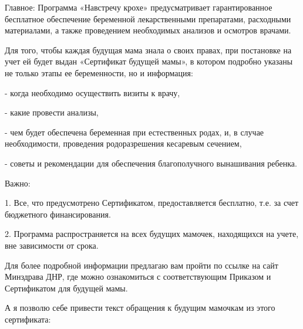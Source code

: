Главное: Программа «Навстречу крохе» предусматривает гарантированное бесплатное
обеспечение беременной лекарственными препаратами, расходными материалами, а
также проведением необходимых анализов и осмотров врачами.

Для того, чтобы каждая будущая мама знала о своих правах, при постановке на
учет ей будет выдан «Сертификат будущей мамы», в котором подробно указаны не
только этапы ее беременности, но и информация:

- когда необходимо осуществить визиты к врачу,

- какие провести анализы,

- чем будет обеспечена беременная при естественных родах, и, в случае
необходимости, проведения родоразрешения кесаревым сечением,

- советы и рекомендации для обеспечения благополучного вынашивания ребенка.

Важно:

1. Все, что предусмотрено Сертификатом, предоставляется бесплатно, т.е. за счет
бюджетного финансирования.

2. Программа распространяется на всех будущих мамочек, находящихся на учете,
вне зависимости от срока.

Для более подробной информации предлагаю вам пройти по ссылке на сайт Минздрава
ДНР, где можно ознакомиться с соответствующим Приказом и Сертификатом для
будущей мамы.

А я позволю себе привести текст обращения к будущим мамочкам из этого
сертификата:

